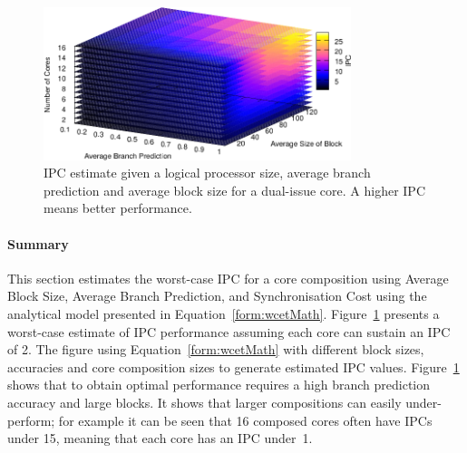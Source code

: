 \begin{figure}[t]
    \centering
    \includegraphics[width=0.8\textwidth]{cases-paper/graphics/limit_study/summary.pdf}
    \caption{IPC estimate given a logical processor size, average branch prediction and average block size for a dual-issue core. A higher IPC means better performance.}
    \label{fig:lm_summ}
\vspace{5mm}
\end{figure}

\paragraph{Summary}

This section estimates the worst-case IPC for a core composition using Average Block Size, Average Branch Prediction, and Synchronisation Cost using the analytical model presented in Equation~\ref{form:wcetMath}.
Figure~\ref{fig:lm_summ} presents a worst-case estimate of IPC performance assuming each core can sustain an IPC of 2.
The figure using Equation~\ref{form:wcetMath} with different block sizes, accuracies and core composition sizes to generate estimated IPC values.
Figure~\ref{fig:lm_summ} shows that to obtain optimal performance requires a high branch prediction accuracy and large blocks.
It shows that larger compositions can easily under-perform; for example it can be seen that 16 composed cores often have IPCs under 15, meaning that each core has an IPC under~1.

